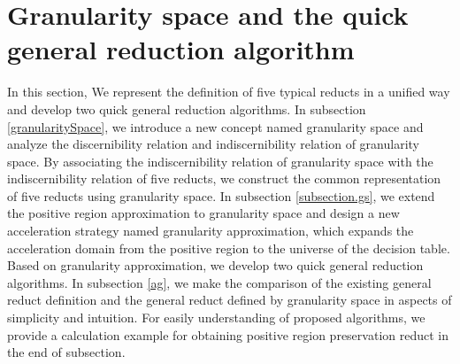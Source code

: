 \documentclass[review]{elsarticle}
\begin{document}
\section{Granularity space and the quick general reduction algorithm}
	In this section, We represent the definition of five typical reducts in a unified way and develop two quick general reduction algorithms. 
	In subsection \ref{granularitySpace}, we introduce a new concept named granularity space and analyze the discernibility relation and indiscernibility relation of granularity space. By associating the indiscernibility relation of granularity space with the indiscernibility relation of five reducts, we construct the common representation of five reducts using granularity space.
	In subsection \ref{subsection.gs}, we extend the positive region approximation to granularity space and design a new acceleration strategy named granularity approximation, which expands the acceleration domain from the positive region to the universe of the decision table. Based on granularity approximation, we develop two quick general reduction algorithms.
	In subsection \ref{ag}, we make the comparison of the existing general reduct definition and the general reduct defined by granularity space in aspects of simplicity and intuition. For easily understanding of proposed algorithms, we provide a calculation example for obtaining positive region preservation reduct in the end of subsection.
\end{document}
